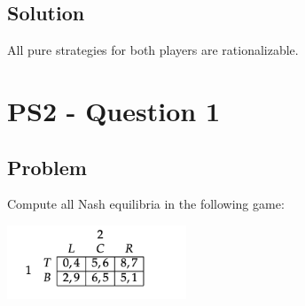 \documentclass[10pt, a4paper]{article}
\begin{document}
  \subsection*{Solution}
    All pure strategies for both players are rationalizable.
\section*{PS2 - Question 1}
  \subsection*{Problem}
    Compute all Nash equilibria in the following game:
    \begin{center}
      \includegraphics[width = 0.4\textwidth]{PS2-1.png}
    \end{center}
\end{document}
